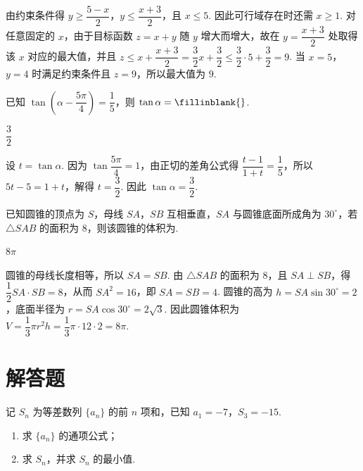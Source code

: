 \begin{solution}
由约束条件得 \(y\ge\dfrac{5-x}{2}\)，\(y\le\dfrac{x+3}{2}\)，且 \(x\le5\). 因此可行域存在时还需 \(x\ge1\). 对任意固定的 \(x\)，由于目标函数 \(z=x+y\) 随 \(y\) 增大而增大，故在 \(y=\dfrac{x+3}{2}\) 处取得该 \(x\) 对应的最大值，并且
\(z\le x+\dfrac{x+3}{2}=\dfrac32x+\dfrac32\le\dfrac32\cdot5+\dfrac32=9\). 当 \(x=5\)，\(y=4\) 时满足约束条件且 \(z=9\)，所以最大值为 \(9\).
\end{solution}

\begin{problem}
已知 \(\tan\left(\alpha-\dfrac{5\pi}{4}\right)=\dfrac15\)，则 \(\tan\alpha=\fillinblank{}\).
\end{problem}

\begin{answer}
\(\dfrac32\)
\end{answer}

\begin{solution}
设 \(t=\tan\alpha\). 因为 \(\tan\dfrac{5\pi}{4}=1\)，由正切的差角公式得
\(\dfrac{t-1}{1+t}=\dfrac15\)，所以 \(5t-5=1+t\)，解得 \(t=\dfrac32\). 因此 \(\tan\alpha=\dfrac32\).
\end{solution}

\begin{problem}
已知圆锥的顶点为 \(S\)，母线 \(SA\)，\(SB\) 互相垂直，\(SA\) 与圆锥底面所成角为 \(30^\circ\)，若 \(\triangle SAB\) 的面积为 \(8\)，则该圆锥的体积为\fillinblank{}.
\end{problem}

\begin{answer}
\(8\pi\)
\end{answer}

\begin{solution}
圆锥的母线长度相等，所以 \(SA=SB\). 由 \(\triangle SAB\) 的面积为 \(8\)，且 \(SA\perp SB\)，得 \(\dfrac12SA\cdot SB=8\)，从而 \(SA^2=16\)，即 \(SA=SB=4\). 圆锥的高为 \(h=SA\sin30^\circ=2\)，底面半径为 \(r=SA\cos30^\circ=2\sqrt3\). 因此圆锥体积为 \(V=\dfrac13\pi r^2h=\dfrac13\pi\cdot12\cdot2=8\pi\).
\end{solution}

\section{解答题}


\begin{problem}
记 \(S_n\) 为等差数列 \(\{a_n\}\) 的前 \(n\) 项和，已知 \(a_1=-7\)，\(S_3=-15\).

\begin{enumerate}
    \item 求 \(\{a_n\}\) 的通项公式；
    \item 求 \(S_n\)，并求 \(S_n\) 的最小值.
\end{enumerate}
\end{problem}

